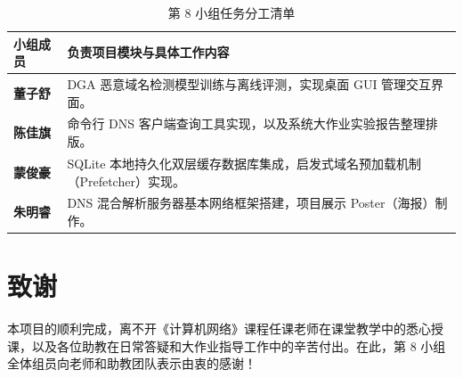 \documentclass[11pt,a4paper]{ctexart}
\begin{document}
\begin{table}[H]
    \centering
    \color{Charcoal}
    \caption{第 8 小组任务分工清单}
    \vspace{0.2cm}
    \renewcommand{\arraystretch}{1.3}
    \begin{tabularx}{\textwidth}{lX}
        \toprule
        \textbf{小组成员} & \textbf{负责项目模块与具体工作内容} \\
        \midrule
        \textbf{董子舒} & DGA 恶意域名检测模型训练与离线评测，实现桌面 GUI 管理交互界面。 \\
        \textbf{陈佳旗} & 命令行 DNS 客户端查询工具实现，以及系统大作业实验报告整理排版。 \\
        \textbf{蒙俊豪} & SQLite 本地持久化双层缓存数据库集成，启发式域名预加载机制（Prefetcher）实现。 \\
        \textbf{朱明睿} & DNS 混合解析服务器基本网络框架搭建，项目展示 Poster（海报）制作。 \\
        \bottomrule
    \end{tabularx}
    \label{tab:division}
\end{table}

\newpage

\section*{致谢}

本项目的顺利完成，离不开《计算机网络》课程任课老师在课堂教学中的悉心授课，以及各位助教在日常答疑和大作业指导工作中的辛苦付出。在此，第 8 小组全体组员向老师和助教团队表示由衷的感谢！
\end{document}

